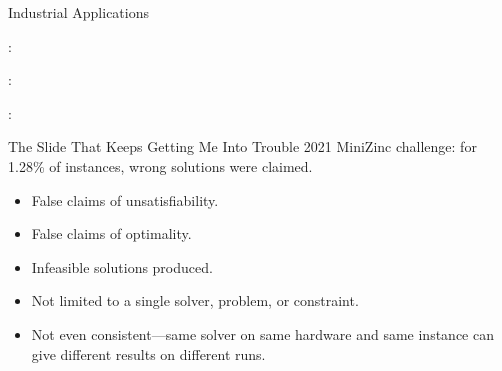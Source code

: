 \documentclass[aspectratio=169,compress,10pt]{beamer}
\begin{document}
\begin{frame}{Industrial Applications}
\begin{center}
\begin{minipage}{12cm}
    \medskip

     \driverb\drivera:
    \chair\trashpanda\parcel\parcel\present


    \medskip

     \driverb\driverb: \tree\parcel\chair\present

    \medskip

     \drivera\phantom{\drivera}:
    \parcel\parcel\laptop\parcel\parcel
\end{minipage}
\end{center}
\end{frame}

\begin{frame}{The Slide That Keeps Getting Me Into Trouble}
    2021 MiniZinc challenge: for 1.28\% of instances, wrong solutions were claimed.
    \\
    \begin{itemize}
        \item False claims of unsatisfiability.
        \item False claims of optimality.
        \item Infeasible solutions produced.
        \item Not limited to a single solver, problem, or constraint.
        \item Not even consistent---same solver on same hardware and same instance can give
            different results on different runs.
    \end{itemize}
\end{frame}
\end{document}
